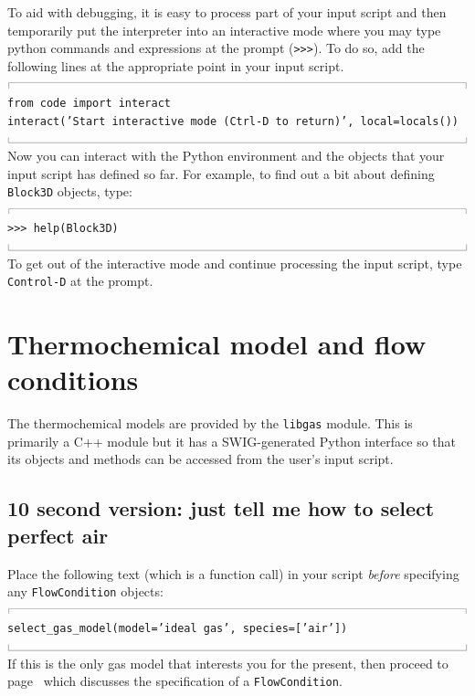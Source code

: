 \documentclass[12pt,a4paper,twoside]{article}
\newcommand{\topbar}{\ensuremath{
    \rule{0.1mm}{2.0mm} \rule[2.0mm]{159.5mm}{0.1mm} \rule{0.1mm}{2.0mm}
}}
\newcommand{\bottombar}{\ensuremath{
    \rule{0.1mm}{2.0mm} \rule{159.5mm}{0.1mm} \rule{0.1mm}{2.0mm}
}}
\begin{document}
\medskip
To aid with debugging, it is easy to process part of your input script and
then temporarily put the interpreter into an interactive mode where 
you may type python commands and expressions at the prompt (\texttt{>>>}).
To do so, add the following lines at the appropriate point in your input
script.\\
%
\topbar\\
\texttt{from code import interact}\\
\texttt{interact('Start interactive mode (Ctrl-D to return)', local=locals())}\\
\bottombar\\
%
Now you can interact with the Python environment and the objects that your
input script has defined so far.
For example, to find out a bit about defining \texttt{Block3D} objects, type:\\
%
\topbar\\
\texttt{>>> help(Block3D)}\\
\bottombar\\
%
To get out of the interactive mode and continue processing the input script,
type \texttt{Control-D} at the prompt.


\section{Thermochemical model and flow conditions}
\label{thermo-flow-sec}
%
The thermochemical models are provided by the \texttt{libgas} module.
This is primarily a C++ module but it has a SWIG-generated Python interface so
that its objects and methods can be accessed from the user's input script.

\subsection{10 second version: just tell me how to select perfect air}
Place the following text (which is a function call) in your script \emph{before}
specifying any \texttt{FlowCondition} objects:\\
%
\topbar\\
\texttt{select\_gas\_model(model='ideal gas', species=['air'])}\\ 
\bottombar\\
%
If this is the only gas model that interests you for the present, then
proceed to page~\pageref{sec:flow_condition} which discusses the specification
of a \texttt{FlowCondition}.
\end{document}
